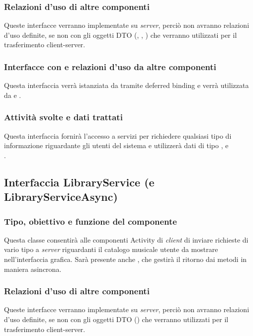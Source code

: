 \subsubsection*{Relazioni d'uso di altre componenti}
Queste interfacce verranno implementate su \emph{server}, perci\`o non
avranno relazioni d'uso definite, se non con gli oggetti DTO (,
, ) che verranno utilizzati per il
trasferimento client-server.

\subsubsection*{Interfacce con e relazioni d'uso da altre componenti}
Questa interfaccia verr\`a istanziata da  tramite deferred
binding e verr\`a utilizzata da  e .

\subsubsection*{Attivit\`a svolte e dati trattati}
Questa interfaccia fornir\`a l'accesso a servizi per richiedere qualsiasi tipo
di informazione riguardante gli utenti del sistema e utilizzer\`a dati di tipo
,  e\\.

\subsection{Interfaccia LibraryService (e LibraryServiceAsync)}
\subsubsection*{Tipo, obiettivo e funzione del componente}
Questa classe consentir\`a alle componenti Activity di \emph{client} di inviare
richieste di vario tipo a \emph{server} riguardanti il catalogo musicale utente
da mostrare nell'interfaccia grafica. Sar\`a presente anche
, che gestir\`a il ritorno dai metodi in maniera
asincrona.
\subsubsection*{Relazioni d'uso di altre componenti}
Queste interfacce verranno implementate su \emph{server}, perci\`o non
avranno relazioni d'uso definite, se non con gli oggetti DTO
() che verranno utilizzati per il trasferimento
client-server.
